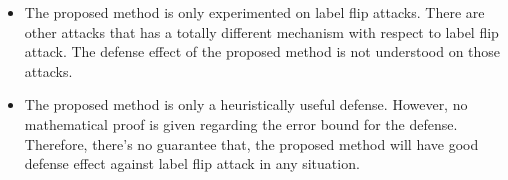 \documentclass[10pt,conference,compsocconf,letterpaper]{IEEEtran}
\begin{document}
\begin{itemize}
\item The proposed method is only experimented on label flip attacks. There are other attacks that has a totally different mechanism with respect to label flip attack. The defense effect of the proposed method is not understood on those attacks.
\item The proposed method is only a heuristically useful defense. However, no mathematical proof is given regarding the error bound for the defense. Therefore, there's no guarantee that, the proposed method will have good defense effect against label flip attack in any situation. 
\end{itemize} 

\begin{thebibliography}{9}


\end{thebibliography}
\end{document}
